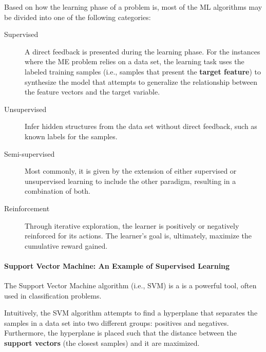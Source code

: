 \documentclass[12pt]{article}
\begin{document}
Based on how the learning phase of a problem is, most of the ML algorithms may be divided into one of the following categories:

\begin{description}
	\item[Supervised] A direct feedback is presented during the learning phase. \cite{pat1996} For the instances where the ME problem relies on a data set, the learning task uses the labeled training samples (i.e., samples that present the \textbf{target feature}) to synthesize the model that attempts to generalize the relationship between the feature vectors and the target variable. \cite{awa2015}

	\item[Unsupervised] Infer hidden structures from the data set without direct feedback, such as known labels for the samples. \cite{awa2015}

	\item[Semi-supervised] Most commonly, it is given by the extension of either supervised or unsupervised learning to include the other paradigm, resulting in a combination of both. \cite{zhu2009}

	\item[Reinforcement] Through iterative exploration, the learner is positively or negatively reinforced for its actions. The learner's goal is, ultimately, maximize the cumulative reward gained. \cite{awa2015}
\end{description}

\paragraph{Support Vector Machine: An Example of Supervised Learning}

The Support Vector Machine algorithm (i.e., SVM) is a is a powerful tool, often used in classification problems.

Intuitively, the SVM algorithm attempts to find a hyperplane that separates the samples in a data set into two different groups: positives and negatives. Furthermore, the hyperplane is placed such that the distance between the \textbf{support vectors} (the closest samples) and it are maximized.
\end{document}
